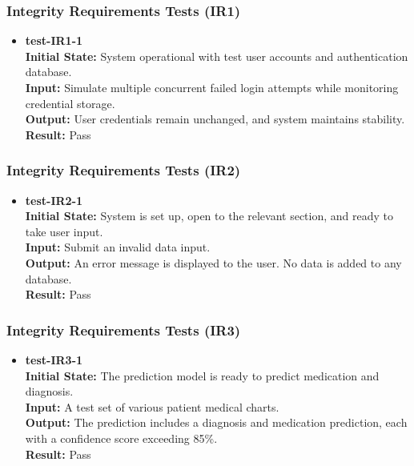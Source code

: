 \documentclass[12pt, titlepage]{article}
\begin{document}
\subsubsection{Integrity Requirements Tests (IR1)} \label{section:4.10.3}

\begin{itemize}
\item \textbf{test-IR1-1} \label{test-IR1-1} \\
\textbf{Initial State:} System operational with test user accounts and authentication database. \\
\textbf{Input:} Simulate multiple concurrent failed login attempts while monitoring credential storage. \\
\textbf{Output:} User credentials remain unchanged, and system maintains stability. \\
\textbf{Result:} Pass \\
\end{itemize}

\subsubsection{Integrity Requirements Tests (IR2)} \label{section:4.10.4}

\begin{itemize}
\item \textbf{test-IR2-1} \label{test-IR2-1} \\
\textbf{Initial State:} System is set up, open to the relevant section, and ready to take user input. \\
\textbf{Input:} Submit an invalid data input. \\
\textbf{Output:} An error message is displayed to the user. No data is added to any database. \\
\textbf{Result:} Pass \\
\end{itemize}

\subsubsection{Integrity Requirements Tests (IR3)} \label{section:4.10.5}

\begin{itemize}
\item \textbf{test-IR3-1} \label{test-IR3-1} \\
\textbf{Initial State:} The prediction model is ready to predict medication and diagnosis. \\
\textbf{Input:} A test set of various patient medical charts. \\
\textbf{Output:} The prediction includes a diagnosis and medication prediction, each with a confidence score exceeding 85\%. \\
\textbf{Result:} Pass \\
\end{itemize}
\end{document}
